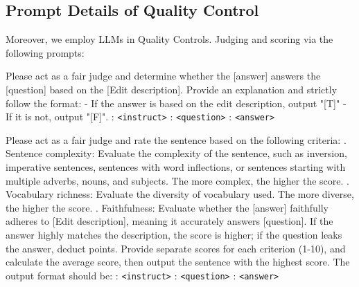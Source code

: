 \subsection{Prompt Details of Quality Control}
\label{sec:appendix_quality}
Moreover, we employ LLMs in Quality Controls. Judging and scoring via the following prompts:

\begin{tcolorbox}
[colback=lightgray!20,colframe=darkgray!80, title= Prompt for judging ]
\label{tab:quality_prompt}
Please act as a fair judge and determine whether the [answer] answers the [question] based on the [Edit description]. Provide an explanation and strictly follow the format:
\newline
- If the answer is based on the edit description, output "[T]"
\newline
- If it is not, output "[F]".
\newline
{}: \texttt{<instruct>}
\newline
[Question]: \texttt{<question>}
\newline
[Answer]: \texttt{<answer>}
\end{tcolorbox}


\begin{tcolorbox}
[colback=lightgray!20,colframe=darkgray!80,title= Prompt for scoring ]
\label{tab:quality_prompt}
Please act as a fair judge and rate the sentence based on the following criteria:
. Sentence complexity: Evaluate the complexity of the sentence, such as inversion, imperative sentences, sentences with word inflections, or sentences starting with multiple adverbs, nouns, and subjects. The more complex, the higher the score.
. Vocabulary richness: Evaluate the diversity of vocabulary used. The more diverse, the higher the score.
. Faithfulness: Evaluate whether the [answer] faithfully adheres to [Edit description], meaning it accurately answers [question]. If the answer highly matches the description, the score is higher; if the question leaks the answer, deduct points.
\newline
Provide separate scores for each criterion (1-10), and calculate the average score, then output the sentence with the highest score. The output format should be:
\newline
\newline
{}: \texttt{<instruct>}
\newline
[Question]: \texttt{<question>}
\newline
[Answer]: \texttt{<answer>}
\end{tcolorbox}


